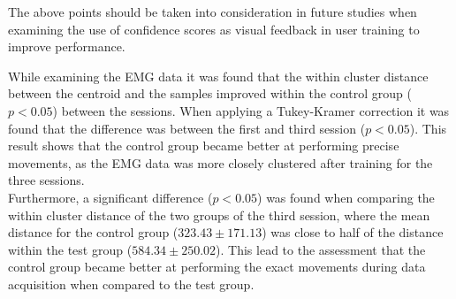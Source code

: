 The above points should be taken into consideration in future studies when examining the use of confidence scores as visual feedback in user training to improve performance. 

While examining the EMG data it was found that the within cluster distance between the centroid and the samples improved within the control group ($p < 0.05$) between the sessions. When applying a Tukey-Kramer correction it was found that the difference was between the first and third session ($p < 0.05$).%
This result shows that the control group became better at performing precise movements, as the EMG data was more closely clustered after training for the three sessions. \\
Furthermore, a significant difference ($p < 0.05$) was found when comparing the within cluster distance of the two groups of the third session, where the mean distance for the control group ($323.43 \pm 171.13$) was close to half of the distance within the test group ($584.34 \pm 250.02$). This lead to the assessment that the control group became better at performing the exact movements during data acquisition when compared to the test group.%


